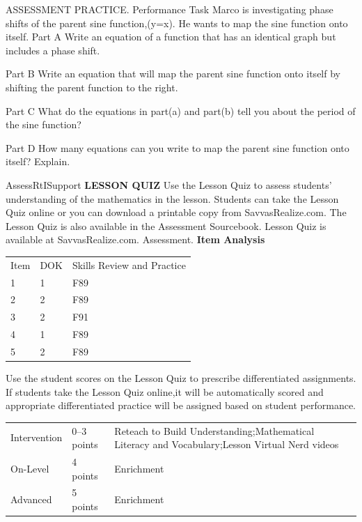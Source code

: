 \documentclass{article}
\newenvironment{practice}[2]{}{}        %
\newenvironment{te-addendum}[2]{}{}     %
\newcommand{\answer}[1]{}               %
\begin{document}
\begin{practice}{28}{3}
ASSESSMENT PRACTICE. Performance Task Marco is investigating phase shifts of the parent sine function,(y=\sin x). He wants to map the sine function onto itself.
Part A Write an equation of a function that has an identical graph but includes a phase shift.
\answer{Part A Sample:(y=\sin(x+2\pi))}
Part B Write an equation that will map the parent sine function onto itself by shifting the parent function to the right.
\answer{Part B Sample:(y=\sin(x-2\pi))}
Part C What do the equations in part(a) and part(b) tell you about the period of the sine function?
\answer{Part C The period of the sine function is(2\pi).}
Part D How many equations can you write to map the parent sine function onto itself? Explain.
\answer{Part D infinitely many;The sine function has a period of(2\pi),so the graph repeats on every interval of(2\pi). There are an infinite number of intervals of(2\pi),so there are an infinite number of equations that will map the sine function onto itself.}
\end{practice}
\begin{te-addendum}{Assess}{RtISupport}
\textbf{LESSON QUIZ}
Use the Lesson Quiz to assess students' understanding of the mathematics in the lesson.
Students can take the Lesson Quiz online or you can download a printable copy from SavvasRealize.com. The Lesson Quiz is also available in the Assessment Sourcebook.
Lesson Quiz is available at SavvasRealize.com. Assessment.
\textbf{Item Analysis}
\begin{tabular}{lll}
Item & DOK & Skills Review and Practice \\
1 & 1 & F89 \\
2 & 2 & F89 \\
3 & 2 & F91 \\
4 & 1 & F89 \\
5 & 2 & F89 \\
\end{tabular}
Use the student scores on the Lesson Quiz to prescribe differentiated assignments.
If students take the Lesson Quiz online,it will be automatically scored and appropriate differentiated practice will be assigned based on student performance.
\begin{tabular}{lll}
Intervention & 0--3 points & Reteach to Build Understanding;Mathematical Literacy and Vocabulary;Lesson Virtual Nerd videos \\
On-Level & 4 points & Enrichment \\
Advanced & 5 points & Enrichment \\
\end{tabular}
\end{te-addendum}
\end{document}
